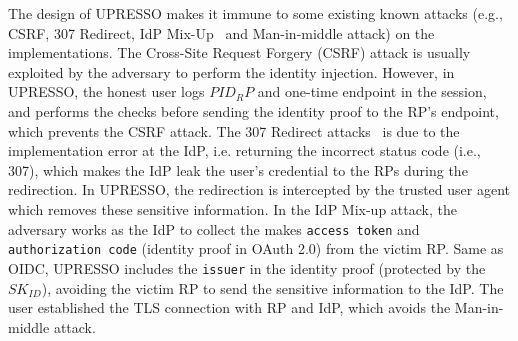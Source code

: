 The design of UPRESSO makes it immune to some existing known attacks (e.g., CSRF, 307 Redirect, IdP Mix-Up~\cite{FettKS16} and Man-in-middle attack) on the implementations. The Cross-Site Request Forgery (CSRF) attack is  usually exploited by the adversary to perform the identity injection. However, in UPRESSO, the honest user logs  $PID_RP$ and one-time endpoint in the session,  and performs the checks before sending the identity proof to the RP's endpoint, which prevents the CSRF attack.  The 307 Redirect attacks~\cite{FettKS16} is due to the implementation error at the IdP, i.e. returning the incorrect status code (i.e., 307), which makes the IdP leak the user's credential to the RPs during the redirection. In UPRESSO, the redirection is intercepted by the trusted user agent which removes these sensitive information. In the IdP Mix-up attack, the adversary works as the IdP to collect the makes \verb+access token+ and \verb+authorization code+ (identity proof in OAuth 2.0) from the victim RP. Same as OIDC, UPRESSO includes the \verb+issuer+ in the identity proof (protected by the $SK_{ID}$), avoiding the victim RP to send the sensitive information to the IdP. The user established the TLS connection with RP and IdP, which avoids the Man-in-middle attack.

